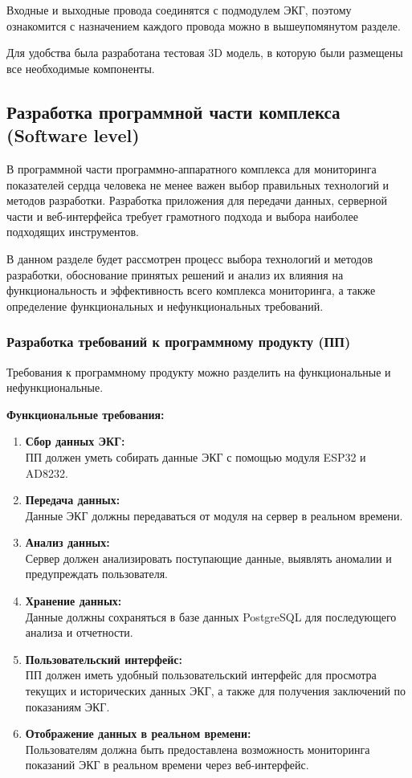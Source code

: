 \documentclass[12pt, russian]{extarticle}
\begin{document}
\begin{spacing}{1.5}
Входные и выходные провода соединятся с подмодулем ЭКГ, поэтому ознакомится с назначением каждого провода можно в вышеупомянутом разделе.

Для удобства была разработана тестовая 3D модель, в которую были размещены все необходимые компоненты.

\newpage
\subsection{Разработка программной части комплекса (Software level)}


В программной части программно-аппаратного комплекса для мониторинга показателей сердца человека не менее важен выбор правильных технологий и методов разработки.
Разработка приложения для передачи данных, серверной части и веб-интерфейса требует грамотного подхода и выбора наиболее подходящих инструментов. 

В данном разделе будет рассмотрен процесс выбора технологий и методов разработки, обоснование принятых решений и анализ их влияния на функциональность и эффективность всего комплекса мониторинга, а также определение функциональных и нефункциональных требований.

\subsubsection{Разработка требований к программному продукту (ПП)}

Требования к программному продукту можно разделить на функциональные и нефункциональные.

\noindent
\textbf{Функциональные требования:}

\begin{enumerate}
    \item \textbf{Сбор данных ЭКГ:} \\
        ПП должен уметь собирать данные ЭКГ с помощью модуля ESP32 и AD8232.
    \item \textbf{Передача данных:} \\
        Данные ЭКГ должны передаваться от модуля на сервер в реальном времени.
    \item \textbf{Анализ данных:} \\
        Сервер должен анализировать поступающие данные, выявлять аномалии и предупреждать пользователя.
    \item \textbf{Хранение данных:} \\
        Данные должны сохраняться в базе данных PostgreSQL для последующего анализа и отчетности.
    \item \textbf{Пользовательский интерфейс:} \\
        ПП должен иметь удобный пользовательский интерфейс для просмотра текущих и исторических данных ЭКГ, а также для получения заключений по показаниям ЭКГ.
    \item \textbf{Отображение данных в реальном времени:} \\
        Пользователям должна быть предоставлена
    возможность мониторинга показаний ЭКГ в реальном времени через веб-интерфейс.
\end{enumerate}


\end{spacing}
\end{document}

